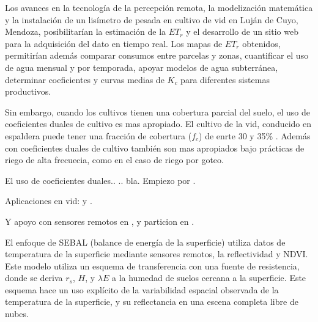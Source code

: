 \documentclass[]{article}
\begin{document}
Los avances en la tecnología  de la percepción remota,  la modelización matemática y la instalación de un lisímetro de pesada en cultivo de vid en Luján de Cuyo, Mendoza, posibilitarían la estimación de la $ET_r$ y el desarrollo de un sitio web para la adquisición del dato en tiempo real. Los mapas de $ET_r$ obtenidos, permitirían además comparar consumos entre parcelas y zonas, cuantificar el uso de agua mensual y por temporada, apoyar modelos de agua subterránea, determinar coeficientes y curvas medias de $K_c$ para diferentes sistemas productivos.

Sin embargo, cuando los cultivos tienen una cobertura parcial del suelo, el uso de coeficientes duales de cultivo es mas apropiado. El cultivo de la vid, conducido en espaldera puede tener una fracción de cobertura ($f_c$) de enrte 30 y 35\% \citep{Poblete-Echeverria2012a}. Además con coeficientes duales de cultivo también son mas apropiados bajo prácticas de riego de alta frecuecia, como en el caso de riego por goteo. 

El uso de  coeficientes duales.. .. bla. Empiezo por \citep{Allen2000}.

Aplicaciones en vid: \citep{Poblete-Echeverria2012a} y \citep{Zhao2015a}.

Y apoyo con sensores remotos en \citep{Er-Raki2007}, y particion en \citep{Er-Raki2010}.




El enfoque de SEBAL (balance de energía de la superficie) utiliza datos de temperatura de la superficie mediante sensores remotos, la reflectividad y NDVI. Este modelo utiliza un esquema de transferencia con una fuente de resistencia, donde se deriva $r_{s} $, $H$, y $\lambda E$ a la humedad de suelos cercana a la superficie. Este esquema hace un uso explícito de la variabilidad espacial observada de la temperatura de la superficie, y su reflectancia en una escena completa libre de nubes. 
\end{document}
